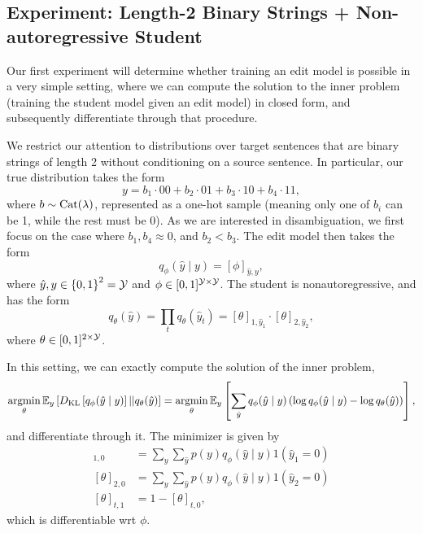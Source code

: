 \documentclass[11pt]{article}
\begin{document}
\subsection{Experiment: Length-2 Binary Strings + Non-autoregressive Student}
Our first experiment will determine whether training an edit model is possible in a
very simple setting, where we can compute the solution to the inner problem
(training the student model given an edit model) in closed form,
and subsequently differentiate through that procedure.

We restrict our attention to distributions over target sentences that are
binary strings of length 2 without conditioning on a source sentence.
In particular, our true distribution takes the form
$$y = b_1\cdot 00 + b_2\cdot 01 + b_3\cdot 10 + b_4\cdot 11,$$
where $b\sim\mathrm{Cat}(\lambda)$, represented as a one-hot sample
(meaning only one of $b_i$ can be 1, while the rest must be 0).
As we are interested in disambiguation, we first focus on the case where
$b_1, b_4 \approx 0$, and $b_2 < b_3$.
The edit model then takes the form
$$q_\phi(\hat{y} \mid y)= [\phi]_{\hat{y},y},$$
where $\hat{y},y \in \left\{0,1\right\}^2 = \mathcal{Y}$ and $\phi \in [0,1]^{\mathcal{Y}\times\mathcal{Y}}$.
The student is nonautoregressive, and has the form
$$q_\theta(\hat{y}) = \prod_t q_\theta(\hat{y}_t)
= [\theta]_{1,\hat{y}_1} \cdot [\theta]_{2,\hat{y}_2},$$
where $\theta\in[0,1]^{2\times\mathcal{Y}}$.

In this setting, we can exactly compute the solution of the inner problem,
$$
\operatorname*{argmin}_\theta \mathbb{E}_{y}\left[D_\mathrm{KL}\left[q_\phi(\hat{y} \mid y)\right] || q_\theta(\hat{y})\right]
= \operatorname*{argmin}_\theta \mathbb{E}_{y}\left[\sum_{\hat{y}} q_\phi(\hat{y} \mid y)
    \left(\log q_\phi(\hat{y} \mid y) - \log q_\theta(\hat{y})\right)
\right],
$$
and differentiate through it.
The minimizer is given by
\begin{align*}
    [\theta]_{1,0} &= \sum_y\sum_{\hat{y}} p(y)q_\phi(\hat{y}\mid y) 1(\hat{y}_1=0)\\
    [\theta]_{2,0} &= \sum_y\sum_{\hat{y}} p(y)q_\phi(\hat{y}\mid y) 1(\hat{y}_2=0)\\
    [\theta]_{t,1} &= 1 - [\theta]_{t,0},
\end{align*}
which is differentiable wrt $\phi$.
\end{document}

